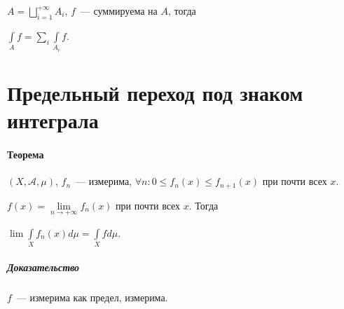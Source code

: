\documentclass{article}
\begin{document}
        $A = \bigsqcup\limits_{i = 1}^{+\infty} A_i$, $f$~--- суммируема на $A$, тогда 
        
            $\int\limits_{A} f = \sum\limits_{i} \int\limits_{A_i} f$.
        
\part{Предельный переход под знаком интеграла}

    \subsection{Теорема}
    
        $(X, \mathcal{A}, \mu)$, $f_n$~--- измерима, $\forall n : 0 \leqslant f_n(x) \leqslant f_{n + 1} (x)$ при почти всех $x$.
        
        $f(x) = \lim\limits_{n \rightarrow +\infty} f_n(x)$ при почти всех $x$. Тогда
        
        $\lim \int\limits_{X} f_n(x) d \mu = \int\limits_{X} f d \mu$.
        
        \subsubsection{Доказательство}
        
            $f$~--- измерима как предел, измерима.
            
\end{document}
